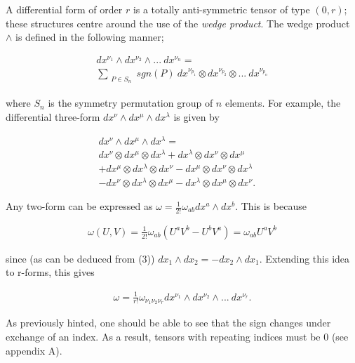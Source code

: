 \documentclass[fleqn, twocolumn, 10pt]{article}
\begin{document}
A differential form of order $r$ is a totally anti-symmetric tensor of type $(0,r)$; these structures centre around the use of the \textit{wedge product}. The wedge product $\land$ is defined in the following manner;

\begin{ceqn}
\begin{equation}\tag{3}
\begin{aligned}
dx^{\nu_1}\land dx^{\nu_2}\land ...\: dx^{\nu_n} =\;\;\;\;\;\;\;\;\;\; \\ \sum_{\substack{P \in S_n}} sgn(P)\: dx^{\nu_{p_1}}\otimes dx^{\nu_{p_2}}\otimes ...\: dx^{\nu_{p_n}}
\end{aligned}
\end{equation}
\end{ceqn}
where $S_n$ is the symmetry permutation group of $n$ elements. For example, the differential three-form $dx^{\nu}\land dx^{\mu}\land dx^{\lambda}$ is given by

\begin{ceqn}
\begin{align*}
dx^{\nu}\land dx^{\mu}\land dx^{\lambda} =\;\;\;\;\;\;\;\;\;\;\;\;\;\;\;\;\; \\dx^{\nu}\otimes dx^{\mu}\otimes dx^{\lambda} + dx^{\lambda}\otimes dx^{\nu}\otimes dx^{\mu}\;\;\;\;\; \\ + dx^{\mu}\otimes dx^{\lambda}\otimes dx^{\nu} - dx^{\mu}\otimes dx^{\nu}\otimes dx^{\lambda}\;\;\;\;\; \\ - dx^{\nu}\otimes dx^{\lambda}\otimes dx^{\mu} - dx^{\lambda}\otimes dx^{\mu}\otimes dx^{\nu}.\;\;\;\;
\end{align*}
\end{ceqn}

Any two-form can be expressed as $\omega = \frac{1}{2!}\omega_{ab}dx^a \land dx^b$. This is because

\begin{ceqn}
\begin{align*}
\omega(U, V) = \frac{1}{2!}\omega_{ab}(U^a V^b - U^bV^a) = \omega_{ab}U^aV^b
\end{align*}
\end{ceqn}
since (as can be deduced from (3)) $dx_1 \land dx_2 = -dx_2 \land dx_1$. Extending this idea to r-forms, this gives

\begin{ceqn}
\begin{align*}
\omega = \frac{1}{r!}\omega_{\nu_1\nu_2\nu_r} dx^{\nu_1}\land dx^{\nu_2}\land ...\: dx^{\nu_r}.
\end{align*}
\end{ceqn}
As previously hinted, one should be able to see that the sign changes under exchange of an index. As a result, tensors with repeating indices must be 0 (see appendix A). 
\end{document}
